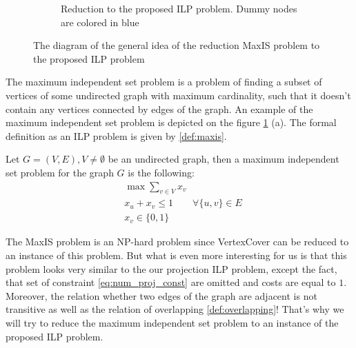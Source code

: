 \begin{figure}[ht]
\begin{subfigure}{.5\textwidth}
        \caption{Reduction to the proposed ILP problem. Dummy nodes are colored in \textcolor{blue!60}{blue}}
    \end{subfigure}
    \caption{The diagram of the general idea of the reduction MaxIS problem to the proposed ILP problem}
    \label{fig:maxis_reduction}
\end{figure}

The maximum independent set problem is a problem of finding a subset of vertices of some undirected
graph with maximum cardinality, such that it doesn't contain any vertices connected by edges of the graph.
An example of the maximum independent set problem is depicted on the figure \ref{fig:maxis_reduction} (a).
The formal definition as an ILP problem is given by \ref{def:maxis}.
\begin{definition}[MaxIS] \label{def:maxis}
    Let \( G=(V, E), V \neq \emptyset \) be an undirected graph, then a maximum independent set problem for the graph \( G \) is the following:
    \begin{align*}
         & \max \sum\limits_{v \in V} x_v                               \\
         & x_u + x_v \leq 1               \qquad \forall \{u, v\} \in E \\
         & x_v \in \{0, 1\}
    \end{align*}
\end{definition}

The MaxIS problem is an NP-hard \cite{pemmaraju2003computational} problem since VertexCover can be reduced to an instance of
this problem. But what is even more interesting for us is that this problem looks very similar to the
our projection ILP problem, except the fact, that set of constraint \eqref{eq:num_proj_const} are
omitted and costs are equal to \( 1 \). Moreover, the relation whether two edges of the graph are adjacent
is not transitive as well as the relation of overlapping \ref{def:overlapping}! That's why we will try to reduce
the maximum independent set problem to an instance of the proposed ILP problem.

